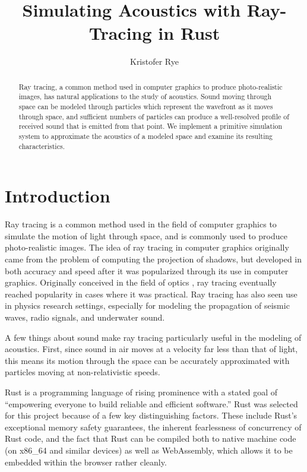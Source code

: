 \documentclass[10pt]{article}
\title{Simulating Acoustics with Ray-Tracing in Rust}
\author{Kristofer Rye}
\begin{document}
\maketitle

\begin{abstract}
  Ray tracing, a common method used in computer graphics to produce
  photo-realistic images, has natural applications to the study of acoustics.
  Sound moving through space can be modeled through particles which represent
  the wavefront as it moves through space, and sufficient numbers of particles
  can produce a well-resolved profile of received sound that is emitted from
  that point.  We implement a primitive simulation system to approximate the
  acoustics of a modeled space and examine its resulting characteristics.
\end{abstract}

\section{Introduction}

Ray tracing is a common method used in the field of computer graphics to
simulate the motion of light through space, and is commonly used to produce
photo-realistic images.  The idea of ray tracing in computer graphics originally
came from the problem of computing the projection of shadows, \cite{Appel1968}
but developed in both accuracy and speed after it was popularized through its
use in computer graphics.  Originally conceived in the field of optics
\cite{Spencer62}, ray tracing eventually reached popularity in cases where it
was practical.  Ray tracing has also seen use in physics research settings,
especially for modeling the propagation of seismic waves, radio signals, and
underwater sound.

A few things about sound make ray tracing particularly useful in the modeling of
acoustics.  First, since sound in air moves at a velocity far less than that of
light, this means its motion through the space can be accurately approximated
with particles moving at non-relativistic speeds.

Rust is a programming language of rising prominence with a stated goal of
``empowering everyone to build reliable and efficient software.'' \cite{Rust}
Rust was selected for this project because of a few key distinguishing factors.
These include Rust's exceptional memory safety guarantees, the inherent
fearlessness of concurrency of Rust code, and the fact that Rust can be compiled
both to native machine code (on x86\_64 and similar devices) as well as
WebAssembly, which allows it to be embedded within the browser rather cleanly.
\end{document}
